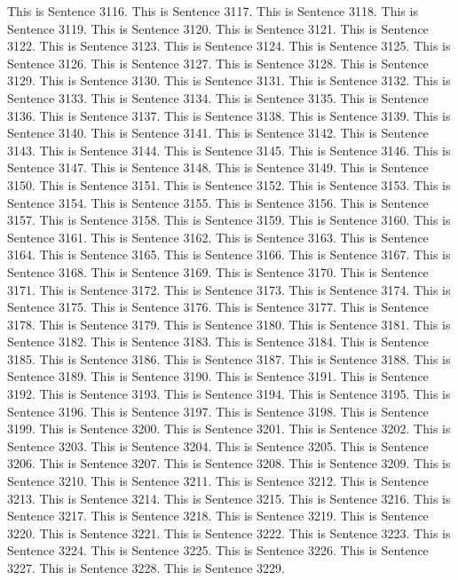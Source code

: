 \documentclass{article}
\begin{document}
This is Sentence 3116.
This is Sentence 3117.
This is Sentence 3118.
This is Sentence 3119.
This is Sentence 3120.
This is Sentence 3121.
This is Sentence 3122.
This is Sentence 3123.
This is Sentence 3124.
This is Sentence 3125.
This is Sentence 3126.
This is Sentence 3127.
This is Sentence 3128.
This is Sentence 3129.
This is Sentence 3130.
This is Sentence 3131.
This is Sentence 3132.
This is Sentence 3133.
This is Sentence 3134.
This is Sentence 3135.
This is Sentence 3136.
This is Sentence 3137.
This is Sentence 3138.
This is Sentence 3139.
This is Sentence 3140.
This is Sentence 3141.
This is Sentence 3142.
This is Sentence 3143.
This is Sentence 3144.
This is Sentence 3145.
This is Sentence 3146.
This is Sentence 3147.
This is Sentence 3148.
This is Sentence 3149.
This is Sentence 3150.
This is Sentence 3151.
This is Sentence 3152.
This is Sentence 3153.
This is Sentence 3154.
This is Sentence 3155.
This is Sentence 3156.
This is Sentence 3157.
This is Sentence 3158.
This is Sentence 3159.
This is Sentence 3160.
This is Sentence 3161.
This is Sentence 3162.
This is Sentence 3163.
This is Sentence 3164.
This is Sentence 3165.
This is Sentence 3166.
This is Sentence 3167.
This is Sentence 3168.
This is Sentence 3169.
This is Sentence 3170.
This is Sentence 3171.
This is Sentence 3172.
This is Sentence 3173.
This is Sentence 3174.
This is Sentence 3175.
This is Sentence 3176.
This is Sentence 3177.
This is Sentence 3178.
This is Sentence 3179.
This is Sentence 3180.
This is Sentence 3181.
This is Sentence 3182.
This is Sentence 3183.
This is Sentence 3184.
This is Sentence 3185.
This is Sentence 3186.
This is Sentence 3187.
This is Sentence 3188.
This is Sentence 3189.
This is Sentence 3190.
This is Sentence 3191.
This is Sentence 3192.
This is Sentence 3193.
This is Sentence 3194.
This is Sentence 3195.
This is Sentence 3196.
This is Sentence 3197.
This is Sentence 3198.
This is Sentence 3199.
This is Sentence 3200.
This is Sentence 3201.
This is Sentence 3202.
This is Sentence 3203.
This is Sentence 3204.
This is Sentence 3205.
This is Sentence 3206.
This is Sentence 3207.
This is Sentence 3208.
This is Sentence 3209.
This is Sentence 3210.
This is Sentence 3211.
This is Sentence 3212.
This is Sentence 3213.
This is Sentence 3214.
This is Sentence 3215.
This is Sentence 3216.
This is Sentence 3217.
This is Sentence 3218.
This is Sentence 3219.
This is Sentence 3220.
This is Sentence 3221.
This is Sentence 3222.
This is Sentence 3223.
This is Sentence 3224.
This is Sentence 3225.
This is Sentence 3226.
This is Sentence 3227.
This is Sentence 3228.
This is Sentence 3229.
\end{document}
